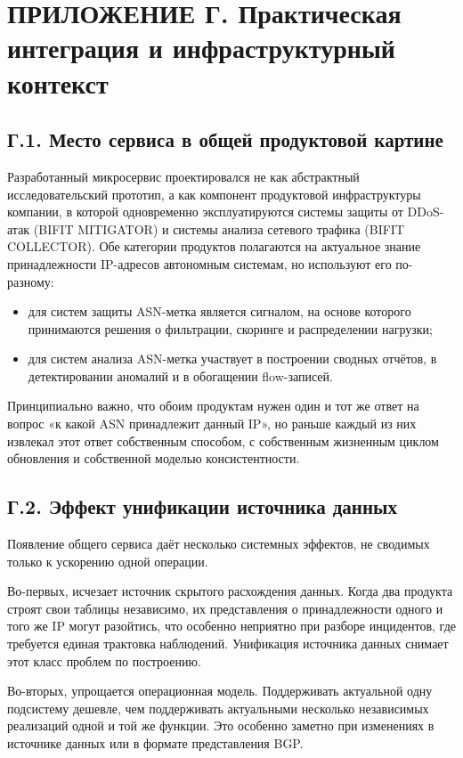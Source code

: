 \section*{ПРИЛОЖЕНИЕ Г. Практическая интеграция и инфраструктурный контекст}

\subsection*{Г.1. Место сервиса в общей продуктовой картине}

Разработанный микросервис проектировался не как абстрактный
исследовательский прототип, а как компонент продуктовой
инфраструктуры компании, в которой одновременно эксплуатируются
системы защиты от DDoS-атак (BIFIT MITIGATOR) и системы анализа
сетевого трафика (BIFIT COLLECTOR). Обе категории продуктов
полагаются на актуальное знание принадлежности IP-адресов автономным
системам, но используют его по-разному:

\begin{itemize}
\item для систем защиты ASN-метка является сигналом, на основе
которого принимаются решения о фильтрации, скоринге и распределении
нагрузки;
\item для систем анализа ASN-метка участвует в построении сводных
отчётов, в детектировании аномалий и в обогащении flow-записей.
\end{itemize}

Принципиально важно, что обоим продуктам нужен один и тот же ответ
на вопрос «к какой ASN принадлежит данный IP», но раньше каждый из
них извлекал этот ответ собственным способом, с собственным
жизненным циклом обновления и собственной моделью консистентности.

\subsection*{Г.2. Эффект унификации источника данных}

Появление общего сервиса даёт несколько системных эффектов, не
сводимых только к ускорению одной операции.

Во-первых, исчезает источник скрытого расхождения данных.
Когда два продукта строят свои таблицы независимо, их представления
о принадлежности одного и того же IP могут разойтись, что особенно
неприятно при разборе инцидентов, где требуется единая трактовка
наблюдений. Унификация источника данных снимает этот класс проблем
по построению.

Во-вторых, упрощается операционная модель. Поддерживать актуальной
одну подсистему дешевле, чем поддерживать актуальными несколько
независимых реализаций одной и той же функции. Это особенно заметно
при изменениях в источнике данных или в формате представления BGP.

